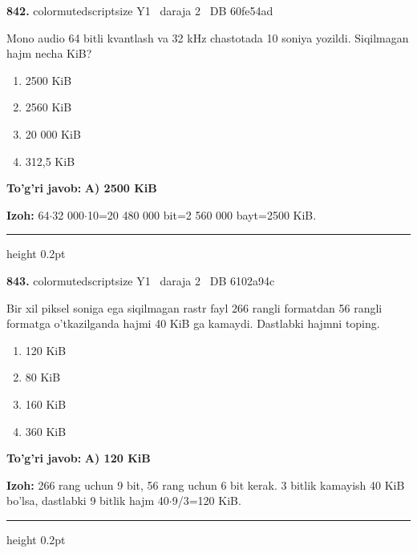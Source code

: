 \documentclass[10pt,a4paper,oneside]{article}
\begin{document}
\noindent\textbf{\color{ink}842.}  {color{muted}scriptsize Y1 \textbullet\ daraja 2 \textbullet\ DB 60fe54ad}
\par
Mono audio 64 bitli kvantlash va 32 kHz chastotada 10 soniya yozildi. Siqilmagan hajm necha KiB?
\begin{enumerate}[label=\Alph*),leftmargin=9mm]
\item 2500 KiB
\item 2560 KiB
\item 20 000 KiB
\item 312,5 KiB
\end{enumerate}
\begin{tcolorbox}[enhanced,breakable,colback=teal!4,colframe=teal!50!black,boxrule=0.5pt,arc=1.1mm,left=3mm,right=3mm,top=1.7mm,bottom=1.7mm,before skip=2mm,after skip=2mm]
\textbf{\color{teal}To'g'ri javob:} \textbf{A) 2500 KiB}
\par\smallskip
\textbf{Izoh:} 64\ensuremath{\cdot}32 000\ensuremath{\cdot}10=20 480 000 bit=2 560 000 bayt=2500 KiB.
\end{tcolorbox}
\vspace{2mm}\hrule height 0.2pt \vspace{3mm}

\noindent\textbf{\color{ink}843.}  {color{muted}scriptsize Y1 \textbullet\ daraja 2 \textbullet\ DB 6102a94c}
\par
Bir xil piksel soniga ega siqilmagan rastr fayl 266 rangli formatdan 56 rangli formatga o'tkazilganda hajmi 40 KiB ga kamaydi. Dastlabki hajmni toping.
\begin{enumerate}[label=\Alph*),leftmargin=9mm]
\item 120 KiB
\item 80 KiB
\item 160 KiB
\item 360 KiB
\end{enumerate}
\begin{tcolorbox}[enhanced,breakable,colback=teal!4,colframe=teal!50!black,boxrule=0.5pt,arc=1.1mm,left=3mm,right=3mm,top=1.7mm,bottom=1.7mm,before skip=2mm,after skip=2mm]
\textbf{\color{teal}To'g'ri javob:} \textbf{A) 120 KiB}
\par\smallskip
\textbf{Izoh:} 266 rang uchun 9 bit, 56 rang uchun 6 bit kerak. 3 bitlik kamayish 40 KiB bo'lsa, dastlabki 9 bitlik hajm 40\ensuremath{\cdot}9/3=120 KiB.
\end{tcolorbox}
\vspace{2mm}\hrule height 0.2pt \vspace{3mm}
\end{document}
